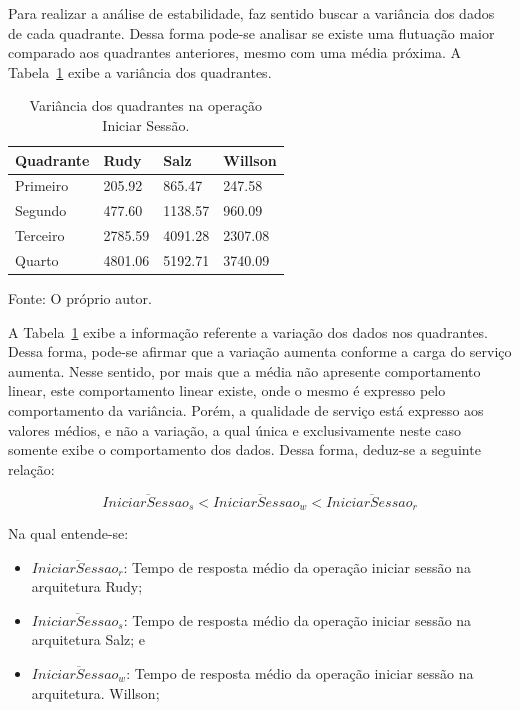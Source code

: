 Para realizar a análise de estabilidade, faz sentido buscar a variância dos dados de cada quadrante.
%
Dessa forma pode-se analisar se existe uma flutuação maior comparado aos quadrantes anteriores, mesmo com uma média próxima.
%
A Tabela~\ref{tab:op_start_session_var} exibe a variância dos quadrantes.


\begin{table}[htb!]
\centering
\begin{adjustbox}{max width=\textwidth}
\caption{Variância dos quadrantes na operação Iniciar Sessão.}
\label{tab:op_start_session_var}
\begin{tabular}{l|l|l|l}

\hline \hline

Quadrante & Rudy    & Salz    & Willson \\ \hline \hline

Primeiro  & 205.92 & 865.47 & 247.58 \\ \hline

Segundo   & 477.60 & 1138.57 & 960.09 \\ \hline

Terceiro  & 2785.59 & 4091.28 & 2307.08 \\ \hline

Quarto    & 4801.06 & 5192.71 & 3740.09 \\ \hline \hline

\end{tabular}

\end{adjustbox}

Fonte: O próprio autor.
\end{table}

A Tabela~\ref{tab:op_start_session_var} exibe a informação referente a variação dos dados nos quadrantes.
%
Dessa forma, pode-se afirmar que a variação aumenta conforme a carga do serviço aumenta.
%
Nesse sentido, por mais que a média não apresente comportamento linear, este comportamento linear existe, onde o mesmo é expresso pelo comportamento da variância.
%
Porém, a qualidade de serviço está expresso aos valores médios, e não a variação, a qual única e exclusivamente neste caso somente exibe o comportamento dos dados.
%
Dessa forma, deduz-se a seguinte relação:

$$
  \overline{IniciarSessao_{s}} < \overline{IniciarSessao_{w}} <\overline{IniciarSessao_{r}}
$$

Na qual entende-se:

\begin{itemize}
 \item $\overline{IniciarSessao_{r}}$: Tempo de resposta médio da operação iniciar sessão na arquitetura Rudy;
 \item $\overline{IniciarSessao_{s}}$: Tempo de resposta médio da operação iniciar sessão na arquitetura Salz; e
 \item $\overline{IniciarSessao_{w}}$: Tempo de resposta médio da operação iniciar sessão na arquitetura. Willson;
\end{itemize}

